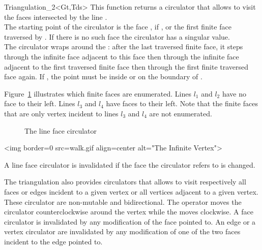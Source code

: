\begin{ccClassTemplate}{Triangulation_2<Gt,Tds>}
{ This function returns a circulator that allows to visit the 
 faces intersected by the line . \\
 The starting point of the circulator is the face , if
 , or the first finite face traversed by .
 If there is no such face the circulator has a singular value.\\
 The circulator wraps around the  :
after the last traversed finite face, it steps through the infinite face adjacent
to this face then through the infinite face adjacent to the first
traversed finite face then through the first finite traversed face again.
\ccPrecond If , the point  must be
inside or on the boundary of .}

Figure~\ref{I1_fig_Line_face_circulator} illustrates which finite faces are enumerated. Lines
$l_1$ and $l_2$ have no face to their left. Lines $l_3$ and $l_4$
have faces to their left. Note that the finite faces that are only vertex
incident to lines $l_3$ and  $l_4$ are not enumerated.

\begin{ccTexOnly}
\begin{figure}
\begin{center}   \end{center}
\caption{The line face circulator}
\label{I1_fig_Line_face_circulator}
\end{figure}
\end{ccTexOnly} 

\begin{ccHtmlOnly}
<img border=0 src=walk.gif align=center alt="The Infinite Vertex">
\end{ccHtmlOnly} 

A line face circulator is invalidated if the face the circulator refers
to is changed.

\ccThreeToTwo




The triangulation also provides circulators that allows to visit 
respectively all faces or edges incident to a given vertex
or all vertices adjacent to a given vertex.
These circulator are
non-mutable
and bidirectional.
 The operator  moves the circulator
counterclockwise around the vertex while
the  moves clockwise.
A face circulator is invalidated by any modification of the face pointed to.
An edge or a vertex circulator are invalidated by any modification
of one of the two faces incident to the edge pointed to.


\end{ccClassTemplate}
